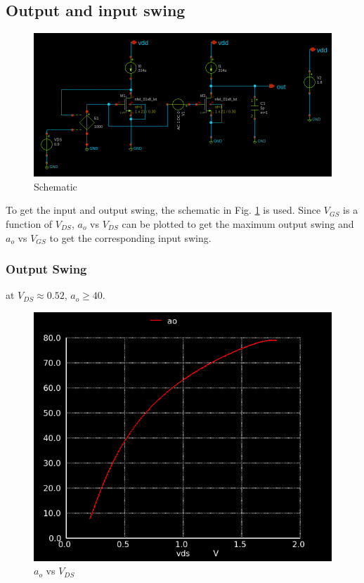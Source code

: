 \documentclass[conference]{IEEEtran}
\begin{document}
\subsection{Output and input swing}
\begin{figure}[H]
	\centering 
	\includegraphics[width=\columnwidth]{schem_large.png}
	\caption{Schematic}
	\label{schem-large}
\end{figure}
To get the input and output swing, the schematic in Fig. \ref{schem-large} is used. Since 
$V_{GS}$ is a function of $V_{DS}$, $a_o$ vs $V_{DS}$ can be plotted to get the maximum output
swing and $a_o$ vs $V_{GS}$ to get the corresponding input swing. 

\vspace{8pt}
\subsubsection{Output Swing}
at $V_{DS}\approx 0.52$, $a_o \geq 40$. 
\begin{figure}[H]
	\centering 
	\includegraphics[scale=0.3]{ao-vds.png}
	\caption{$a_o$ vs $V_{DS}$}
	\label{swing-out}
\end{figure}
\end{document}
